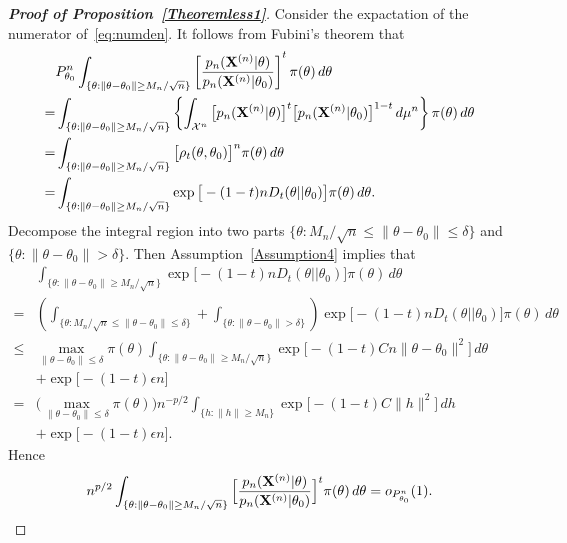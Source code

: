 \documentclass[11pt]{article}
\theoremstyle{plain}
\theoremstyle{definition}
\theoremstyle{remark}
\begin{document}
\begin{appendices}
\begin{proof}[\textbf{Proof of Proposition~\ref{Theoremless1}}]
    Consider the expactation of the numerator of~\ref{eq:numden}.
    It follows from Fubini's theorem that
\begin{align*}
    &P_{\theta_0}^n\int_{\{\theta:\|\theta-\theta_0\|\geq {M_n}/{\sqrt{n}}\} } \left[ \frac{p_n(\mathbf{X}^{(n)}|\theta)}{p_n(\mathbf{X}^{(n)}|\theta_0)}  \right]^{t} \pi(\theta) \, d \theta
    \\
    =&
    \int_{\{\theta:\|\theta-\theta_0\|\geq {M_n}/{\sqrt{n}}\} } \left\{\int_{\mathcal{X}^n}\big[ {p_n} (\mathbf{X}^{(n)}|\theta)\big]^t \big[ p_n (\mathbf{X}^{(n)}|\theta_0) \big]^{1-t} \, d\mu^n \right\} \pi(\theta) \, d \theta\\
    =&
    \int_{\{\theta:\|\theta-\theta_0\|\geq {M_n}/{\sqrt{n}}\} } \big[ \rho_{t}(\theta,\theta_0) \big]^n \pi(\theta) \, d \theta\\
    = &
    \int_{\{\theta:\|\theta-\theta_0\|\geq {M_n}/{\sqrt{n}}\} } \exp \big[-(1-t) n D_t(\theta||\theta_0) \big] \pi(\theta) \, d \theta.
\end{align*}
    Decompose the integral region into two parts $\{\theta:{M_n}/{\sqrt{n}}\leq \|\theta-\theta_0\|\leq \delta \}$ and $\{\theta: \|\theta-\theta_0\|>\delta\}$.
Then Assumption~\ref{Assumption4} implies that
\begin{align*}
    &\int_{\{\theta:\|\theta-\theta_0\|\geq {M_n}/{\sqrt{n}}\} } 
    \exp \big[ -(1-t) {n} D_t(\theta||\theta_0) \big] \pi(\theta) \, d \theta
    \\
    =&\left(
        \int_{\{\theta:{M_n}/{\sqrt{n}}\leq \|\theta-\theta_0\|\leq \delta \}}
        +
\int_{\{\theta: \|\theta-\theta_0\|>\delta\}}
    \right)
    \exp\big[ -(1-t) {n} D_t(\theta||\theta_0) \big] \pi(\theta) \, d \theta
    \\
    \leq &
    \max_{\|\theta-\theta_0\|\leq \delta}\pi(\theta)
    \int_{\big\{\theta: \|\theta-\theta_0\|\geq {M_n}/{\sqrt{n}} \big\}}
    \exp\big[ -(1-t)C {n} \|\theta-\theta_0\|^2 \big]
    \, d \theta
    \\
    &+
    \exp\big[ -(1-t)\epsilon n\big]
    \\
    =&
    \big(\max_{\|\theta-\theta_0\|\leq \delta}\pi(\theta)\big)
    n^{-p/2}\int_{\big\{h: \|h\|\geq M_n \big\}} \exp\big[-(1-t)C \|h\|^2 \big] \, d h
    \\
    &+
    \exp\big[ -(1-t)\epsilon n\big].
\end{align*}
Hence
\begin{equation}\label{Prop4:eq2}
    n^{p/2}\int_{\{\theta:\|\theta-\theta_0\|\geq {M_n}/{\sqrt{n}}\} } \Big[ \frac{p_n(\mathbf{X}^{(n)}|\theta)}{p_n(\mathbf{X}^{(n)}|\theta_0)}  \Big]^{t} \pi(\theta) \, d \theta
    =o_{P^n_{\theta_0}}(1).
\end{equation}


\end{proof}
\end{appendices}
\end{document}
